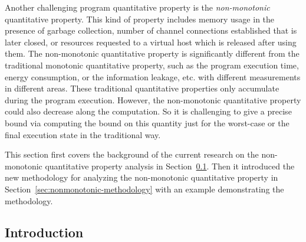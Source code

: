 Another challenging program quantitative property is the \emph{non-monotonic} quantitative property.
This kind of property includes memory usage in the presence of garbage collection,
number of channel connections established that is later closed,
or resources requested to a virtual host which is released after using them. 
The non-monotonic quantitative property is significantly different from the traditional monotonic quantitative property,
such as the program execution time, energy consumption,
or the information leakage, etc. with different measurements in different areas.
These traditional quantitative properties only accumulate during the program execution. 
However, the non-monotonic quantitative property could also decrease along the computation.
So it is challenging to give a precise bound via computing the bound on this quantity just for the worst-case or the final execution state in the traditional way.

This section first covers the background of the current research on the non-monotonic
quantitative property analysis in Section~\ref{sec:nonmonotonic-intro}.
Then it introduced the new methodology for analyzing the non-monotonic quantitative property in Section~\ref{sec:nonmonotonic-methodology} with an example demonstrating the methodology.
\subsection{Introduction }
\label{sec:nonmonotonic-intro}
